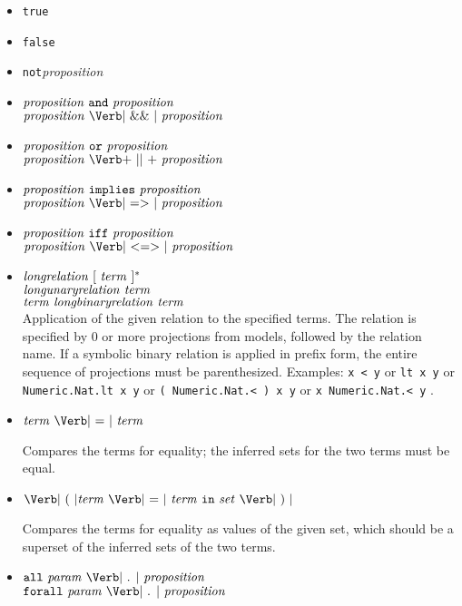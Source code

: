 \documentclass[11pt]{article}
\newcommand{\keywd}[1]{\mbox{\texttt{#1}}\xspace}
\newcommand{\ALL}{\keywd{all}}
\newcommand{\AND}{\keywd{and}}
\newcommand{\FALSE}{\keywd{false}}
\newcommand{\FORALL}{\keywd{forall}}
\newcommand{\IFF}{\keywd{iff}}
\newcommand{\IMPLY}{\keywd{implies}}
\newcommand{\IN}{\keywd{in}}
\newcommand{\NOT}{\keywd{not}}
\newcommand{\OR}{\keywd{or}}
\newcommand{\TRUE}{\keywd{true}}
\newcommand{\metav}[1]{\mbox{\textit{#1}}\xspace}
\newcommand{\Setexp}{\metav{set}}
\newcommand{\Proposition}{\metav{proposition}}
\newcommand{\Param}{\metav{param}}
\newcommand{\Term}{\metav{term}}
\newcommand{\AAND}{\mbox{\Verb| \&\& |}}
\newcommand{\EQUALS}{\mbox{\Verb| = |}}
\newcommand{\IIFF}{\mbox{\Verb| <=> |}}
\newcommand{\IIMPLY}{\mbox{\Verb| => |}}
\newcommand{\LPAREN}{\mbox{\Verb| ( |}}
\newcommand{\OOR}{\mbox{\Verb+ || +}}
\newcommand{\RPAREN}{\mbox{\Verb| ) |}}
\newcommand{\PERIOD}{\mbox{\Verb| . |}}
\begin{document}
\begin{itemize}
\item \TRUE

\item \FALSE

\item \NOT \Proposition

\item $\Proposition\ \AND\ \Proposition$\\
      $\Proposition\ \AAND\ \Proposition$

\item $\Proposition\ \OR\ \Proposition$\\
      $\Proposition\ \OOR\ \Proposition$

\item $\Proposition\ \IMPLY\ \Proposition$\\
      $\Proposition\ \IIMPLY\ \Proposition$

\item $\Proposition\ \IFF\ \Proposition$\\
      $\Proposition\ \IIFF\ \Proposition$

\item $\metav{longrelation}\ [\ \Term\ ]^*$\\
      $\metav{longunaryrelation}\ \Term$\\
      $\Term\ \metav{longbinaryrelation}\ \Term$\\
     
      
      Application of the given relation to the specified terms.  The
      relation is specified by 0 or more projections from models,
      followed by the relation name.  If a symbolic binary relation
      is applied in prefix form, the entire sequence of projections
      must be parenthesized. 
      Examples: \Verb|x < y| or \Verb|lt x y| or \Verb|Numeric.Nat.lt x y| or
      \Verb|( Numeric.Nat.< ) x y| or \Verb|x Numeric.Nat.< y| .

\item $\Term\ \EQUALS\ \Term$

   Compares the terms for equality; the inferred sets for the two terms
   must be equal.

\item $\LPAREN \Term\ \EQUALS\ \Term\ \IN\ \Setexp\ \RPAREN$

   Compares the terms for equality as values of the given set, which
   should be a superset of the inferred sets of the two terms.

\item $\ALL\ \Param\ \PERIOD\ \Proposition$\\
      $\FORALL\ \Param\ \PERIOD\ \Proposition$


\end{itemize}
\end{document}
